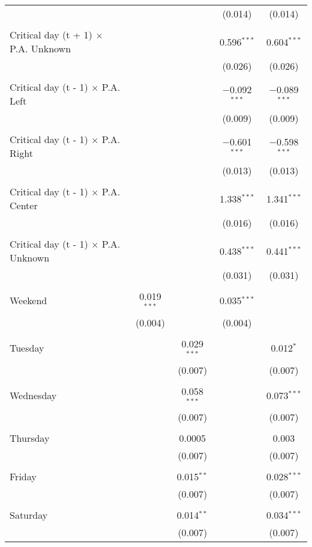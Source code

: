 \documentclass[
]{article}
\begin{document}
\begin{table}[!htbp]
{\begin{tabular}{@{\extracolsep{5pt}}lcccc}
  &  &  & (0.014) & (0.014) \\ 
  & & & & \\ 
 Critical day (t + 1) $\times$ P.A. Unknown &  &  & 0.596$^{***}$ & 0.604$^{***}$ \\ 
  &  &  & (0.026) & (0.026) \\ 
  & & & & \\ 
 Critical day (t - 1) $\times$ P.A. Left &  &  & $-$0.092$^{***}$ & $-$0.089$^{***}$ \\ 
  &  &  & (0.009) & (0.009) \\ 
  & & & & \\ 
 Critical day (t - 1) $\times$ P.A. Right &  &  & $-$0.601$^{***}$ & $-$0.598$^{***}$ \\ 
  &  &  & (0.013) & (0.013) \\ 
  & & & & \\ 
 Critical day (t - 1) $\times$ P.A. Center &  &  & 1.338$^{***}$ & 1.341$^{***}$ \\ 
  &  &  & (0.016) & (0.016) \\ 
  & & & & \\ 
 Critical day (t - 1) $\times$ P.A. Unknown &  &  & 0.438$^{***}$ & 0.441$^{***}$ \\ 
  &  &  & (0.031) & (0.031) \\ 
  & & & & \\ 
 Weekend & 0.019$^{***}$ &  & 0.035$^{***}$ &  \\ 
  & (0.004) &  & (0.004) &  \\ 
  & & & & \\ 
 Tuesday &  & 0.029$^{***}$ &  & 0.012$^{*}$ \\ 
  &  & (0.007) &  & (0.007) \\ 
  & & & & \\ 
 Wednesday &  & 0.058$^{***}$ &  & 0.073$^{***}$ \\ 
  &  & (0.007) &  & (0.007) \\ 
  & & & & \\ 
 Thursday &  & 0.0005 &  & 0.003 \\ 
  &  & (0.007) &  & (0.007) \\ 
  & & & & \\ 
 Friday &  & 0.015$^{**}$ &  & 0.028$^{***}$ \\ 
  &  & (0.007) &  & (0.007) \\ 
  & & & & \\ 
 Saturday &  & 0.014$^{**}$ &  & 0.034$^{***}$ \\ 
  &  & (0.007) &  & (0.007) \\ 

\end{tabular}}
\end{table}
\end{document}
